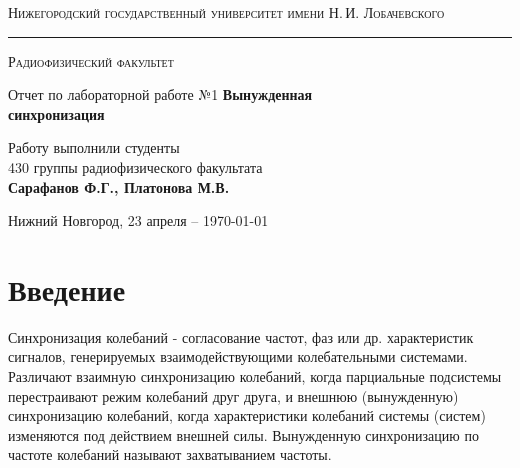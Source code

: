 \documentclass[a4paper,14pt]{extarticle}
\def\labauthors{Сарафанов Ф.Г., Платонова М.В.}
\def\labnumber{1}
\begin{document}
\begin{titlepage}
\begin{center}
{\small\textsc{Нижегородский государственный университет имени Н.\,И. Лобачевского}}
\vskip 2pt \hrule \vskip 3pt
{\small\textsc{Радиофизический факультет}}

\vfill


{{\large Отчет по лабораторной работе №\labnumber}\vskip 12pt {\Huge \bfseries Вынужденная \\[10pt] синхронизация}}

	
\vspace{2cm}
{\large Работу выполнили студенты \\[-0.25em] 430 группы радиофизического факультата \\[0.5em] {\Large \bfseries \labauthors}}



\end{center}

\vfill
	
	
	
\begin{center}
	{Нижний Новгород, 23 апреля -- \today}
\end{center}

\end{titlepage}
\tableofcontents
\newpage





\section*{Введение}

Синхронизация колебаний - согласование частот, фаз или др. характеристик сигналов, генерируемых взаимодействующими колебательными системами. Различают взаимную синхронизацию колебаний, когда парциальные подсистемы перестраивают режим колебаний друг друга, и внешнюю (вынужденную) синхронизацию колебаний, когда характеристики колебаний системы (систем) изменяются под действием внешней силы. Вынужденную синхронизацию по частоте колебаний называют захватыванием частоты.
\end{document}
